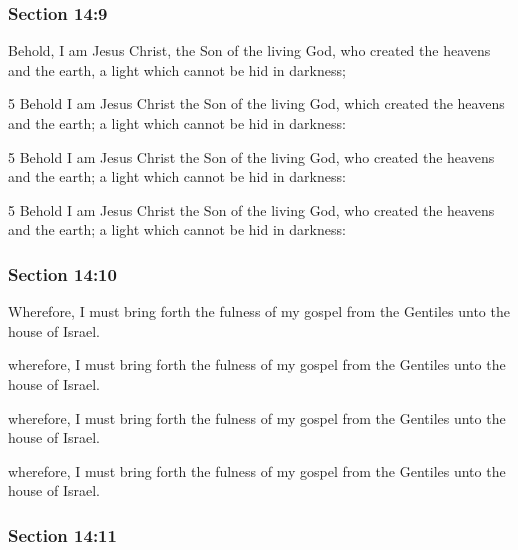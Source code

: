 	\subsubsection{Section 14:9} %
		\label{DC14-9}

		Behold, I am Jesus Christ, the Son of the living God, who created the heavens and the earth, a light which cannot be hid in darkness;

		\begin{framed}
		\scriptsize
			\begin{compactdesc}
				\item[JSP] 5 Behold I am Jesus Christ the Son of the living God, which created the heavens and the earth; a light which cannot be hid in darkness: 
				\item[DC 1835] 5 Behold I am Jesus Christ the Son of the living God, who created the heavens and the earth; a light which cannot be hid in darkness: 
				\item[DC 1844] 5 Behold I am Jesus Christ the Son of the living God, who created the heavens and the earth; a light which cannot be hid in darkness:
			\end{compactdesc}
		\end{framed}

	\subsubsection{Section 14:10} %
		\label{DC14-10}

		Wherefore, I must bring forth the fulness of my gospel from the Gentiles unto the house of Israel.

		\begin{framed}
		\scriptsize
			\begin{compactdesc}
				\item[JSP] wherefore, I must bring forth the fulness of my gospel from the Gentiles unto the house of Israel. 
				\item[DC 1835] wherefore, I must bring forth the fulness of my gospel from the Gentiles unto the house of Israel. 
				\item[DC 1844] wherefore, I must bring forth the fulness of my gospel from the Gentiles unto the house of Israel. 
			\end{compactdesc}
		\end{framed}

	\subsubsection{Section 14:11} %
		\label{DC14-11}

